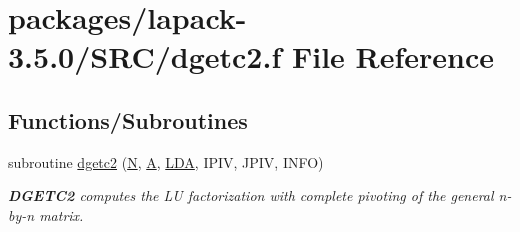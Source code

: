 \hypertarget{dgetc2_8f}{}\section{packages/lapack-\/3.5.0/\+S\+R\+C/dgetc2.f File Reference}
\label{dgetc2_8f}
\subsection*{Functions/\+Subroutines}
\begin{DoxyCompactItemize}
\item 
subroutine \hyperlink{group__doubleGEauxiliary_ga2ecd51f7842c100d6b4ecc99119c012f}{dgetc2} (\hyperlink{polmisc_8c_a0240ac851181b84ac374872dc5434ee4}{N}, \hyperlink{classA}{A}, \hyperlink{example__user_8c_ae946da542ce0db94dced19b2ecefd1aa}{L\+D\+A}, I\+P\+I\+V, J\+P\+I\+V, I\+N\+F\+O)
\begin{DoxyCompactList}\small\item\em {\bfseries D\+G\+E\+T\+C2} computes the L\+U factorization with complete pivoting of the general n-\/by-\/n matrix. \end{DoxyCompactList}\end{DoxyCompactItemize}
